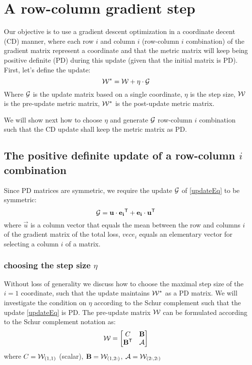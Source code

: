 \section{A row-column gradient step}
Our objective is to use a gradient descent optimization in a coordinate decent (CD) manner, where each row $i$ and column $i$ (row-column $i$ combination) of the gradient matrix represent a coordinate and that the metric matrix will keep being positive definite (PD) during this update (given that the initial matrix is PD). First, let's define the update:
\begin{equation}
   {\mathcal{W^*}} = \mathcal{W} +\eta\cdot\mathcal{G}
   \label{updateEq}
\end{equation}
Where $\mathcal{G}$ is the update matrix based on a single coordinate, $\eta$ is the step size, $\mathcal{W}$ is the pre-update metric matrix, ${\mathcal{W^*}}$ is the post-update metric matrix.

We will show next how to choose  $\eta$ and generate $\mathcal{G}$ row-column $i$ combination such that the CD update shall keep the metric matrix as PD. 


\subsection{The positive definite update of a row-column $i$ combination }
Since PD matrices are symmetric, we require the update $\mathcal{G}$ of \eqref{updateEq} to be symmetric:
\begin{equation}
\mathcal{G} = \mathbf{u}\cdot\mathbf{e_i}{}^\mathsf{T} + \mathbf{e_i}\cdot\mathbf{u}{}^\mathsf{T}
\label{gradMtx}
\end{equation}
where  $\vec{u}$ is a column vector that equals the mean between the row and columns $i$ of the gradient matrix of the total loss, $vec{e_i}$ equals an elementary vector for selecting a column $i$ of a matrix. 


\subsubsection{choosing the step size $\eta$}
Without loss of generality we discuss how to choose the maximal step size of the $i=1$ coordinate, such that the update maintains ${\mathcal{W^*}}$ as a PD matrix. We will investigate the condition on $\eta$ according to the Schur complement  such that the update \eqref{updateEq} is PD.
The pre-update matrix $\mathcal{W}$ can be formulated according to the Schur complement notation as: 
\begin{equation}
\mathcal{W}= \left[ \begin{matrix} C & \mathbf{B} \\ \mathbf{B{}^\mathsf{T}} & \mathcal{A} \end{matrix} \right]
\label{schurNotationPreUpdate}
\end{equation}
where $C = \mathcal{W}_{(1,1)}$ (scalar), $\mathbf{B} = \mathcal{W}_{(1,2:)}$, $\mathcal{A} = \mathcal{W}_{(2:,2:)}$

